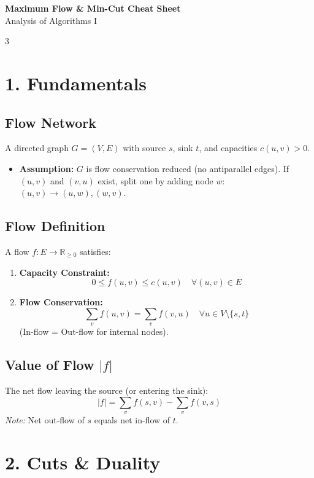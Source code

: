 \documentclass[10pt, a4paper]{article}
\theoremstyle{compact}
\begin{document}
\begin{center}
    {\Large \textbf{Maximum Flow \& Min-Cut Cheat Sheet}} \\
    Analysis of Algorithms I
\end{center}

\begin{multicols}{3}

\section{1. Fundamentals}

\subsection{Flow Network}
A directed graph $G=(V,E)$ with source $s$, sink $t$, and capacities $c(u,v) > 0$.
\begin{itemize}
    \item \textbf{Assumption:} $G$ is flow conservation reduced (no antiparallel edges). If $(u,v)$ and $(v,u)$ exist, split one by adding node $w$: $(u,v) \to (u,w), (w,v)$.
\end{itemize}

\subsection{Flow Definition}
A flow $f: E \to \mathbb{R}_{\ge 0}$ satisfies:
\begin{enumerate}
    \item \textbf{Capacity Constraint:} 
    $$0 \le f(u,v) \le c(u,v) \quad \forall (u,v) \in E$$
    \item \textbf{Flow Conservation:} 
    $$\sum_{v} f(u,v) = \sum_{v} f(v,u) \quad \forall u \in V \setminus \{s,t\}$$
    (In-flow = Out-flow for internal nodes).
\end{enumerate}

\subsection{Value of Flow $|f|$}
The net flow leaving the source (or entering the sink):
$$|f| = \sum_{v} f(s,v) - \sum_{v} f(v,s)$$
\textit{Note:} Net out-flow of $s$ equals net in-flow of $t$.

\section{2. Cuts \& Duality}


\end{multicols}
\end{document}

